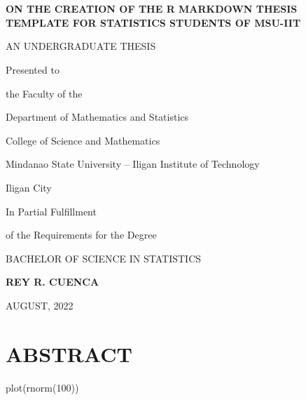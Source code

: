 \documentclass{source/tex/templates/maththesis}
\newenvironment{Shaded}{\begin{snugshade}}{\end{snugshade}}
\newcommand{\DecValTok}[1]{\textcolor[rgb]{0.00,0.00,0.81}{#1}}
\newcommand{\FunctionTok}[1]{\textcolor[rgb]{0.00,0.00,0.00}{#1}}
\newcommand{\NormalTok}[1]{#1}
\begin{document}
\setcounter{page}{1}


\chapter*{}

\phantom{xs}
\vspace{5pt}
\thispagestyle{empty}
\begin{center}
\large\textbf{ON THE CREATION OF THE R MARKDOWN THESIS TEMPLATE FOR STATISTICS STUDENTS OF MSU-IIT} 
\end{center}

\vfill

\begin{center}
AN UNDERGRADUATE THESIS
\end{center}

\begin{center}
Presented to 

the Faculty of the 

Department of Mathematics and Statistics

College of Science and Mathematics

Mindanao State University -- Iligan Institute of Technology

Iligan City
\end{center}

\vfill

\begin{center}
In Partial Fulfillment

of the Requirements for the Degree

BACHELOR OF SCIENCE IN STATISTICS
\end{center}

\vfill

\begin{center}
\textbf{REY R. CUENCA}

AUGUST, 2022
\end{center}

\vspace{-1in}

\hypertarget{abstract-2}{%
\chapter*{ABSTRACT}\label{abstract-2}}

\begin{Shaded}
\begin{Highlighting}[]
\FunctionTok{plot}\NormalTok{(}\FunctionTok{rnorm}\NormalTok{(}\DecValTok{100}\NormalTok{))}
\end{Highlighting}
\end{Shaded}
\end{document}
